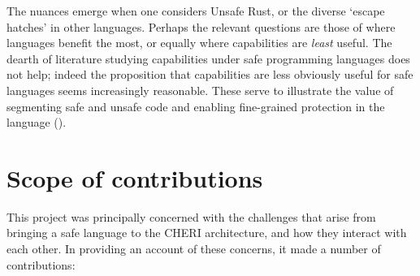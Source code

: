 \documentclass[dissertation.tex]{subfiles}
\begin{document}
The nuances emerge when one considers Unsafe Rust, or the diverse
`escape hatches' in other languages.
Perhaps the relevant questions are those of where languages benefit the
most, or equally where capabilities are \emph{least} useful.
The dearth of literature studying capabilities under safe programming
languages does not help;
indeed the proposition that capabilities are less obviously useful for
safe languages seems increasingly reasonable.
These serve to illustrate the value of segmenting safe and unsafe code
and enabling fine-grained protection in the language
().


\section{Scope of contributions}

This project was principally concerned with the challenges that arise
from bringing a safe language to the CHERI architecture, and how they
interact with each other.
In providing an account of these concerns, it made a number of
contributions:

\end{document}
